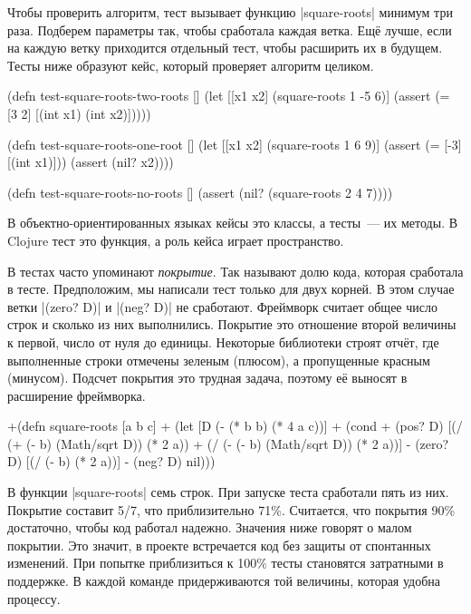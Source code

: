 
Чтобы проверить алгоритм, тест вызывает функцию \spverb|square-roots| минимум
три раза. Подберем параметры так, чтобы сработала каждая ветка. Ещ\"{е} лучше, если
на каждую ветку приходится отдельный тест, чтобы расширить их в будущем. Тесты
ниже образуют кейс, который проверяет алгоритм целиком.

\begin{english}
  \begin{clojure}
(defn test-square-roots-two-roots []
  (let [[x1 x2] (square-roots 1 -5 6)]
    (assert (= [3 2] [(int x1) (int x2)]))))

(defn test-square-roots-one-root []
  (let [[x1 x2] (square-roots 1 6 9)]
    (assert (= [-3] [(int x1)]))
    (assert (nil? x2))))

(defn test-square-roots-no-roots []
  (assert (nil? (square-roots 2 4 7))))
  \end{clojure}
\end{english}

В объектно-ориентированных языках кейсы это классы, а тесты~--- их методы. В
Clojure тест это функция, а роль кейса играет пространство.


В тестах часто упоминают \emph{покрытие}. Так называют долю кода, которая
сработала в тесте. Предположим, мы написали тест только для двух корней. В этом
случае ветки \spverb|(zero? D)| и \spverb|(neg? D)| не сработают. Фреймворк
считает общее число строк и сколько из них выполнились. Покрытие это отношение
второй величины к первой, число от нуля до единицы. Некоторые библиотеки строят
отч\"{е}т, где выполненные строки отмечены зеленым (плюсом), а пропущенные красным
(минусом). Подсчет покрытия это трудная задача, поэтому е\"{е} выносят в расширение
фреймворка.

\begin{english}
  \begin{diff}
+(defn square-roots [a b c]
+  (let [D (- (* b b) (* 4 a c))]
+    (cond
+      (pos? D) [(/ (+ (- b) (Math/sqrt D)) (* 2 a))
+                (/ (- (- b) (Math/sqrt D)) (* 2 a))]
-      (zero? D) [(/ (- b) (* 2 a))]
-      (neg? D) nil)))
  \end{diff}
\end{english}

В функции \spverb|square-roots| семь строк. При запуске теста сработали пять из
них. Покрытие составит 5/7, что приблизительно 71\%. Считается, что покрытия
90\% достаточно, чтобы код работал надежно. Значения ниже говорят о малом
покрытии. Это значит, в проекте встречается код без защиты от спонтанных
изменений. При попытке приблизиться к 100\% тесты становятся затратными в
поддержке. В каждой команде придерживаются той величины, которая удобна
процессу.

